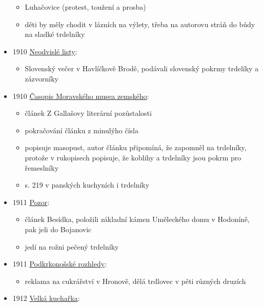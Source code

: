 \begin{itemize}
  \begin{itemize}
  \tightlist
  \item
    Luhačovice (protest, toužení a prosba)
  \item
    děti by měly chodit v lázních na výlety, třeba na autorovu stráň do
    búdy na sladké trdelníky
  \end{itemize}
\item
  1910
  \href{https://ceskadigitalniknihovna.cz/view/uuid:9619abc6-e10c-479a-a5c6-82a48f7789f4?page=uuid\%3Adefe860e-1878-4938-89bc-3a04bc29b94b&source=kkp}{Neodvislé
  listy}:

  \begin{itemize}
  \tightlist
  \item
    Slovenský večer v Havlíčkově Brodě, podávali slovenský pokrmy
    trdelíky a zázvorníky
  \end{itemize}
\item
  1910
  \href{https://ceskadigitalniknihovna.cz/uuid/uuid:f19aaf80-126a-11e8-8cd8-5ef3fc9bb22f}{Časopis
  Moravského musea zemského}:

  \begin{itemize}
  \tightlist
  \item
    článek Z Gallašovy literární pozůstalosti
  \item
    pokračování článku z minulýho čísla
  \item
    popisuje masopust, autor článku připomíná, že zapomněl na trdelníky,
    protože v rukopisech popisuje, že koblihy a trdelníky jsou pokrm pro
    řemeslníky
  \item
    s. 219 v panských kuchyních i trdelníky
  \end{itemize}
\item
  1911
  \href{https://www.digitalniknihovna.cz/vkol/uuid/uuid:be493458-5dbc-42df-9ca1-fa5bef6ae4c6}{Pozor}:

  \begin{itemize}
  \tightlist
  \item
    článek Besídka, položili základní kámen Uměleckého domu v Hodoníně,
    pak jeli do Bojanovic
  \item
    jedí na rožni pečený trdelníky
  \end{itemize}
\item
  1911
  \href{https://ceskadigitalniknihovna.cz/view/uuid:5a976b57-57a4-491f-b403-535f71c739a6?page=uuid\%3A2ec0de06-85d4-11e4-8faf-00155d010f03&fulltext=trdlovec&source=svkhk}{Podkrkonošské
  rozhledy}:

  \begin{itemize}
  \tightlist
  \item
    reklama na cukrářství v Hronově, dělá trdlovec v pěti různých
    druzích
  \end{itemize}
\item
  1912
  \href{https://ndk.cz/view/uuid:e8f12a30-1b67-11e7-96ce-005056827e51?page=uuid\%3Af8cffa60-2933-11e7-a38c-005056827e51}{Velká
  kuchařka}:


\end{itemize}
